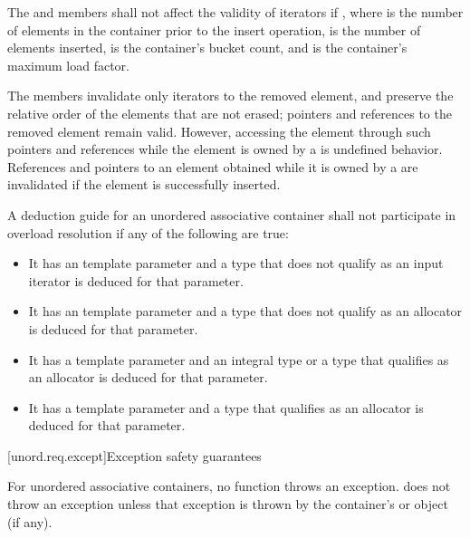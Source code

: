 \pnum
{}%
%
The  and  members shall not affect the validity of iterators if
, where  is the number of elements in
the container prior to the insert operation,  is the
number of elements inserted,  is the container's bucket count, and
 is the container's maximum load factor.

\pnum
The  members invalidate only iterators to the removed element,
and preserve the relative order of the elements that are not erased; pointers
and references to the removed element remain valid. However, accessing the
element through such pointers and references while the element is owned by a
 is undefined behavior. References and pointers to an element
obtained while it is owned by a  are invalidated if the
element is successfully inserted.

\pnum
A deduction guide for an unordered associative container shall not participate in overload resolution
if any of the following are true:
\begin{itemize}
\item It has an  template parameter
and a type that does not qualify as an input iterator is deduced for that parameter.

\item It has an  template parameter
and a type that does not qualify as an allocator is deduced for that parameter.

\item It has a  template parameter
and an integral type or a type that qualifies as an allocator is deduced for that parameter.

\item It has a  template parameter
and a type that qualifies as an allocator is deduced for that parameter.
\end{itemize}

[unord.req.except]{Exception safety guarantees}

\pnum
{}%
%
For unordered associative containers, no  function
throws an exception.  does not throw an
exception unless that exception is thrown by the container's  or
 object (if any).

